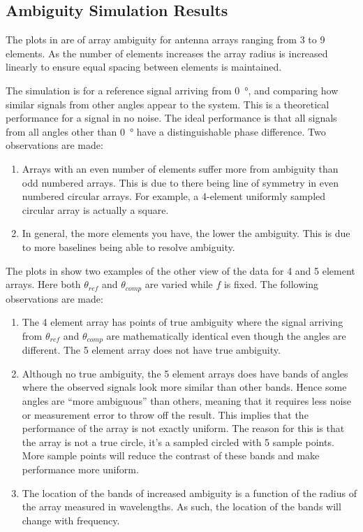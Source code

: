 \subsection{Ambiguity Simulation Results}
The plots in  are of array ambiguity for antenna arrays ranging from 3 to 9 elements. As the number of elements increases the array radius is increased linearly to ensure equal spacing between elements is maintained.

The simulation is for a reference signal arriving from \SI{0}{\degree}, and comparing how similar signals from other angles appear to the system. This is a theoretical performance for a signal in no noise. The ideal performance is that all signals from all angles other than \SI{0}{\degree} have a distinguishable phase difference. Two observations are made:
\begin{enumerate}
  \item Arrays with an even number of elements suffer more from ambiguity than odd numbered arrays. This is due to there being line of symmetry in even numbered circular arrays. For example, a 4-element uniformly sampled circular array is actually a square.
  \item In general, the more elements you have, the lower the ambiguity. This is due to more baselines being able to resolve ambiguity.
\end{enumerate}

The plots in  show two examples of the other view of the data for 4 and 5 element arrays. Here both \(\theta_{ref}\) and \(\theta_{comp}\) are varied while \(f\) is fixed. The following observations are made:
\begin{enumerate}
  \item The 4 element array has points of true ambiguity where the signal arriving from \(\theta_{ref}\) and \(\theta_{comp}\) are mathematically identical even though the angles are different. The 5 element array does not have true ambiguity.
  \item Although no true ambiguity, the 5 element arrays does have bands of angles where the observed signals look more similar than other bands. Hence some angles are ``more ambiguous'' than others, meaning that it requires less noise or measurement error to throw off the result. This implies that the performance of the array is not exactly uniform. The reason for this is that the array is not a true circle, it's a sampled circled with 5 sample points. More sample points will reduce the contrast of these bands and make performance more uniform.
  \item The location of the bands of increased ambiguity is a function of the radius of the array measured in wavelengths. As such, the location of the bands will change with frequency.
\end{enumerate}

